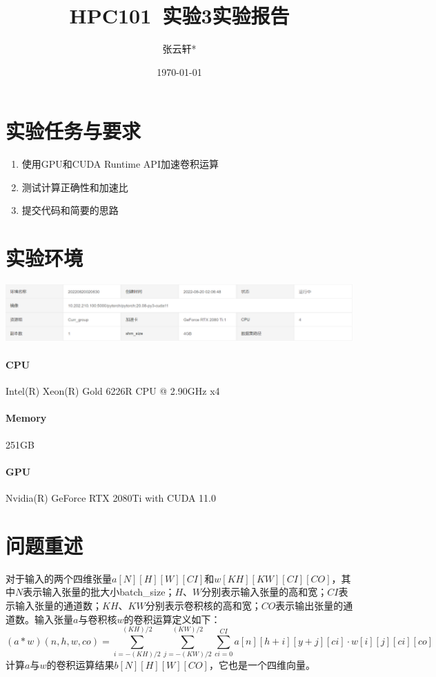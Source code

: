 \documentclass[UTF8,10pt]{ctexart}
\title{\vspace{-2cm}HPC101\ 实验3\quad 实验报告}
\author[ ]{张云轩*\quad 3200105087}
\affil[*]{信息与电子工程学院\quad 信息工程}
\affil[*]{竺可桢学院\quad 工程教育高级班}
\date{\today}
\begin{document}
\maketitle

\section{实验任务与要求}
\begin{enumerate}[1]
    \item 使用GPU和CUDA Runtime API加速卷积运算
    \item 测试计算正确性和加速比
    \item 提交代码和简要的思路
\end{enumerate}

\section{实验环境}
\begin{center}
\includegraphics[scale=0.58]{img/1.PNG}
\end{center}
\paragraph{CPU} Intel(R) Xeon(R) Gold 6226R CPU @ 2.90GHz x4
\paragraph{Memory} 251GB
\paragraph{GPU} Nvidia(R) GeForce RTX 2080Ti with CUDA 11.0

\section{问题重述}
对于输入的两个四维张量$a[N][H][W][CI]$和$w[KH][KW][CI][CO]$，其中$N$表示输入张量的批大小batch\_size；$H$、$W$分别表示输入张量的高和宽；$CI$表示输入张量的通道数；$KH$、$KW$分别表示卷积核的高和宽；$CO$表示输出张量的通道数。输入张量$a$与卷积核$w$的卷积运算定义如下：
\begin{equation}
    (a*w)(n, h, w, co)=\sum_{i=-(KH)/2}^{(KH)/2} \sum_{j=-(KW)/2}^{(KW)/2} \sum_{ci=0}^{CI} a[n][h+i][y+j][ci]·w[i][j][ci][co]
\end{equation}
计算$a$与$w$的卷积运算结果$b[N][H][W][CO]$，它也是一个四维向量。
\end{document}
